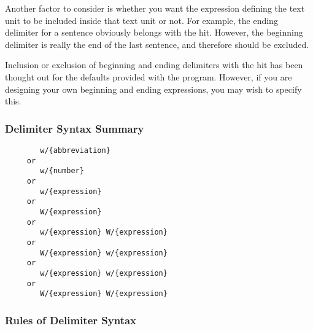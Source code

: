 Another factor to consider is whether you want the expression defining
the text unit to be included inside that text unit or not.  For
example, the ending delimiter for a sentence obviously belongs with
the hit.  However, the beginning delimiter is really the end of the
last sentence, and therefore should be excluded.

Inclusion or exclusion of beginning and ending delimiters with the hit
has been thought out for the defaults provided with the program.
However, if you are designing your own beginning and ending
expressions, you may wish to specify this.

\subsubsection{Delimiter Syntax Summary}
\begin{verbatim}
        w/{abbreviation}
     or
        w/{number}
     or
        w/{expression}
     or
        W/{expression}
     or
        w/{expression} W/{expression}
     or
        W/{expression} w/{expression}
     or
        w/{expression} w/{expression}
     or
        W/{expression} W/{expression}
\end{verbatim}

\subsubsection{Rules of Delimiter Syntax}

